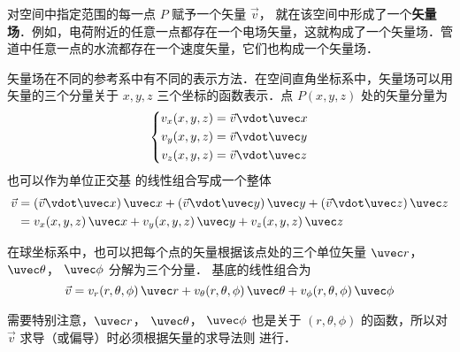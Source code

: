 

对空间中指定范围的每一点 $P$ 赋予一个矢量 $\vec v$， 就在该空间中形成了一个\textbf{矢量场}．例如，电荷附近的任意一点都存在一个电场矢量，这就构成了一个矢量场．管道中任意一点的水流都存在一个速度矢量，它们也构成一个矢量场．

矢量场在不同的参考系中有不同的表示方法．在空间直角坐标系中，矢量场可以用矢量的三个分量关于 $x,y,z$ 三个坐标的函数表示．点 $P(x,y,z)$ 处的矢量分量为
 \begin{equation}
\left\{ \begin{aligned}
{v_x}(x,y,z) &= \vec v \vdot \uvec x\\
{v_y}(x,y,z) &= \vec v \vdot \uvec y\\
{v_z}(x,y,z) &= \vec v \vdot \uvec z
\end{aligned} \right. 
\end{equation}
也可以作为单位正交基 的线性组合写成一个整体
\begin{equation}
\begin{split}
\vec v &= (\vec v \vdot \uvec x)\,\uvec x + (\vec v \vdot \uvec y)\,\uvec y + (\vec v \vdot \uvec z)\,\uvec z\\
 &= {v_x}(x,y,z)\,\uvec x + {v_y}(x,y,z)\,\uvec y + {v_z}(x,y,z)\,\uvec z
\end{split} \end{equation}
 

在球坐标系中，也可以把每个点的矢量根据该点处的三个单位矢量 $\uvec r$，  $\uvec \theta$，  $\uvec \phi$ 分解为三个分量． 基底的线性组合为
\begin{equation}
\vec v = {v_r}(r,\theta ,\phi)\,\uvec r + {v_\theta }(r,\theta ,\phi) \,\uvec\theta  + {v_\phi }(r,\theta ,\phi)\,\uvec \phi  
\end{equation} 

需要特别注意，$\uvec r$，  $\uvec \theta$，  $\uvec \phi$ 也是关于 $(r,\theta ,\phi )$ 的函数，所以对 $\vec v$ 求导（或偏导）时必须根据矢量的求导法则 进行．




